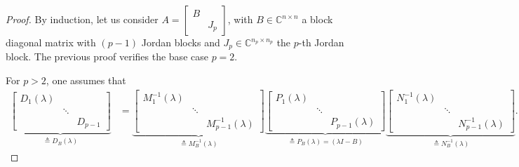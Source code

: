 \documentclass[11pt]{article}
\newcommand{\complex}{\mathbb{C}} %
\begin{document}
\begin{proof}
By induction, let us consider $A=\left[\begin{smallmatrix}
B & \\
 & J_p
\end{smallmatrix}\right]$, with $B \in \complex^{n\times n}$ a block diagonal matrix with $(p-1)$ Jordan blocks and $J_p\in \complex^{n_p\times n_p}$ the \(p\)-th Jordan block. 
The previous proof verifies the base case $p = 2$.

For $p > 2$, one assumes that
\begin{align*}
\underbrace{\begin{bmatrix}
D_1(\lambda) & &\\
& \ddots &\\
& & D_{p-1}
\end{bmatrix} }_{\triangleq D_{B}(\lambda)}
&=
\underbrace{\begin{bmatrix}
M_1^{-1}(\lambda) & &\\
& \ddots &\\
& & M_{p-1}^{-1}(\lambda)
\end{bmatrix}}_{\triangleq M_{B}^{-1}(\lambda)}
\underbrace{\begin{bmatrix}
P_1(\lambda) & &\\
& \ddots &\\
& & P_{p-1}(\lambda)
\end{bmatrix}}_{\triangleq P_{B}(\lambda) = (\lambda I - B)}
\underbrace{\begin{bmatrix}
N_1^{-1}(\lambda) & &\\
& \ddots &\\
& & N_{p-1}^{-1}(\lambda)
\end{bmatrix}}_{\triangleq N_{B}^{-1}(\lambda)}.
\end{align*}


\end{proof}
\end{document}
